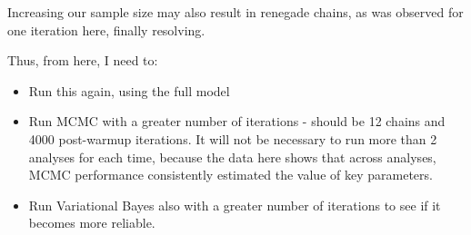 \documentclass[]{article}
\providecommand{\tightlist}{%
  \setlength{\itemsep}{0pt}\setlength{\parskip}{0pt}}
\begin{document}
Increasing our sample size may also result in renegade chains, as was
observed for one iteration here, finally resolving.

Thus, from here, I need to:

\begin{itemize}
\tightlist
\item
  Run this again, using the full model
\item
  Run MCMC with a greater number of iterations - should be 12 chains and
  4000 post-warmup iterations. It will not be necessary to run more than
  2 analyses for each time, because the data here shows that across
  analyses, MCMC performance consistently estimated the value of key
  parameters.
\item
  Run Variational Bayes also with a greater number of iterations to see
  if it becomes more reliable.
\end{itemize}
\end{document}
